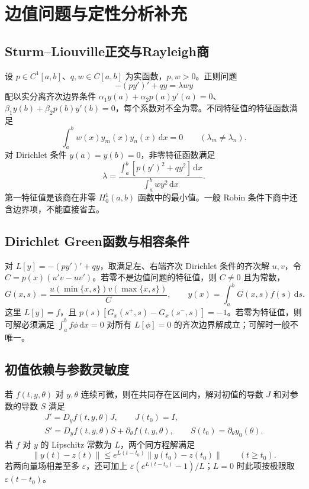 \documentclass[../main.tex]{subfiles}
\begin{document}
\section{边值问题与定性分析补充}
\subsection{Sturm--Liouville正交与Rayleigh商}
设 $p\in C^1[a,b]$、$q,w\in C[a,b]$ 为实函数，$p,w>0$。正则问题
\[
-(py')'+qy=\lambda wy
\]
配以实分离齐次边界条件 $\alpha_1y(a)+\alpha_2p(a)y'(a)=0$、$\beta_1y(b)+\beta_2p(b)y'(b)=0$，每个系数对不全为零。不同特征值的特征函数满足
\[
\int_a^b w(x)y_m(x)y_n(x)\,\mathrm dx=0\qquad(\lambda_m\ne\lambda_n).
\]
对 Dirichlet 条件 $y(a)=y(b)=0$，非零特征函数满足
\[
\lambda=\frac{\int_a^b[p(y')^2+qy^2]\,\mathrm dx}{\int_a^b wy^2\,\mathrm dx}.
\]
第一特征值是该商在非零 $H_0^1(a,b)$ 函数中的最小值。一般 Robin 条件下商中还含边界项，不能直接省去。

\subsection{Dirichlet Green函数与相容条件}
对 $L[y]=-(py')'+qy$，取满足左、右端齐次 Dirichlet 条件的齐次解 $u,v$，令 $C=p(x)(u'v-uv')$。若零不是边值问题的特征值，则 $C\ne0$ 且为常数，
\[
G(x,s)=\frac{u(\min\{x,s\})v(\max\{x,s\})}{C},\qquad
y(x)=\int_a^bG(x,s)f(s)\,\mathrm ds.
\]
这里 $L[y]=f$，且 $p(s)[G_x(s^+,s)-G_x(s^-,s)]=-1$。若零为特征值，则可解必须满足 $\int_a^b f\phi\,\mathrm dx=0$ 对所有 $L[\phi]=0$ 的齐次边界解成立；可解时一般不唯一。

\subsection{初值依赖与参数灵敏度}
若 $f(t,y,\theta)$ 对 $y,\theta$ 连续可微，则在共同存在区间内，解对初值的导数 $J$ 和对参数的导数 $S$ 满足
\begin{gather*}
J'=D_yf(t,y,\theta)J,\qquad J(t_0)=I,\\
S'=D_yf(t,y,\theta)S+\partial_\theta f(t,y,\theta),\qquad
S(t_0)=\partial_\theta y_0(\theta).
\end{gather*}
若 $f$ 对 $y$ 的 Lipschitz 常数为 $L$，两个同方程解满足
\[
\|y(t)-z(t)\|\le e^{L(t-t_0)}\|y(t_0)-z(t_0)\|\qquad(t\ge t_0).
\]
若两向量场相差至多 $\varepsilon$，还可加上 $\varepsilon(e^{L(t-t_0)}-1)/L$；$L=0$ 时此项按极限取 $\varepsilon(t-t_0)$。
\end{document}
